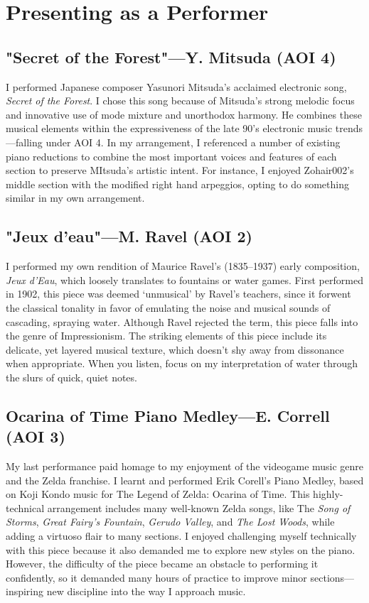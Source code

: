 \documentclass[12pt]{article}
\begin{document}
\section{Presenting as a Performer}

\subsection{"Secret of the Forest"—Y. Mitsuda (AOI 4)}

I performed Japanese composer Yasunori Mitsuda’s acclaimed electronic song, \textit{Secret of the Forest}. I chose this song because of Mitsuda’s strong melodic focus and innovative use of mode mixture and unorthodox harmony. He combines these musical elements within the expressiveness of the late 90’s electronic music trends—falling under AOI 4. In my arrangement, I referenced a number of existing piano reductions to combine the most important voices and features of each section to preserve MItsuda’s artistic intent. For instance, I enjoyed Zohair002’s middle section with the modified right hand arpeggios, opting to do something similar in my own arrangement.\autocite{youtube}


\subsection{"Jeux d'eau"—M. Ravel (AOI 2)}

I performed my own rendition of Maurice Ravel’s (1835–1937) early composition, \textit{Jeux d’Eau}, which loosely translates to fountains or water games. First performed in 1902, this piece was deemed ‘unmusical’ by Ravel’s teachers, since it forwent the classical tonality in favor of emulating the noise and musical sounds of cascading, spraying water. Although Ravel rejected the term, this piece falls into the genre of Impressionism. The striking elements of this piece include its delicate, yet layered musical texture, which doesn't shy away from dissonance when appropriate. When you listen, focus on my interpretation of water through the slurs of quick, quiet notes.

\subsection{Ocarina of Time Piano Medley—E. Correll (AOI 3)}

My last performance paid homage to my enjoyment of the videogame music genre and the Zelda franchise. I learnt and performed Erik Corell’s Piano Medley, based on Koji Kondo music for The Legend of Zelda: Ocarina of Time.\autocite{zelda} This highly-technical arrangement includes many well-known Zelda songs, like The \textit{Song of Storms}, \textit{Great Fairy’s Fountain}, \textit{Gerudo Valley}, and \textit{The Lost Woods}, while adding a virtuoso flair to many sections. I enjoyed challenging myself technically with this piece because it also demanded me to explore new styles on the piano. However, the difficulty of the piece became an obstacle to performing it confidently, so it demanded many hours of practice to improve minor sections—inspiring new discipline into the way I approach music.
\end{document}
